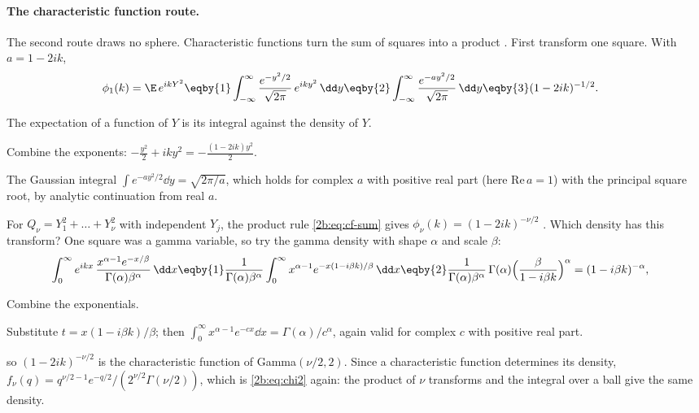 \paragraph{The characteristic function route.} The second route draws no sphere. Characteristic functions turn the sum of squares into a product . First transform one square. With $a=1-2ik$,
\begin{align}
  \phi_1(k)=\E\,e^{ikY^2}
  &\eqby{1} \int_{-\infty}^{\infty}\frac{e^{-y^2/2}}{\sqrt{2\pi}}\,e^{iky^2}\,\dd y
   \eqby{2} \int_{-\infty}^{\infty}\frac{e^{-ay^2/2}}{\sqrt{2\pi}}\,\dd y
   \eqby{3} (1-2ik)^{-1/2} .
  \label{2b:eq:chi2-cf1}
\end{align}
\begin{explain}
  \item The expectation of a function of $Y$ is its integral against the density of $Y$.
  \item Combine the exponents: $-\frac{y^2}{2}+iky^2=-\frac{(1-2ik)y^2}{2}$.
  \item The Gaussian integral $\int e^{-ay^2/2}\dd y=\sqrt{2\pi/a}$, which holds for complex $a$ with positive real part (here $\mathrm{Re}\,a=1$) with the principal square root, by analytic continuation from real $a$.
\end{explain}
For $Q_\nu=Y_1^2+\dots+Y_\nu^2$ with independent $Y_j$, the product rule \eqref{2b:eq:cf-sum} gives $\phi_\nu(k)=(1-2ik)^{-\nu/2}$ . Which density has this transform? One square was a gamma variable, so try the gamma density with shape $\alpha$ and scale $\beta$:
\begin{align}
  \int_0^\infty e^{ikx}\,\frac{x^{\alpha-1}e^{-x/\beta}}{\Gamma(\alpha)\beta^\alpha}\,\dd x
  &\eqby{1} \frac{1}{\Gamma(\alpha)\beta^\alpha}\int_0^\infty x^{\alpha-1}e^{-x(1-i\beta k)/\beta}\,\dd x
   \eqby{2} \frac{1}{\Gamma(\alpha)\beta^\alpha}\,\Gamma(\alpha)\Bigl(\frac{\beta}{1-i\beta k}\Bigr)^{\alpha}
   = (1-i\beta k)^{-\alpha} ,
  \label{2b:eq:gamma-cf}
\end{align}
\begin{explain}
  \item Combine the exponentials.
  \item Substitute $t=x(1-i\beta k)/\beta$; then $\int_0^\infty x^{\alpha-1}e^{-cx}\dd x=\Gamma(\alpha)/c^\alpha$, again valid for complex $c$ with positive real part.
\end{explain}
so $(1-2ik)^{-\nu/2}$ is the characteristic function of Gamma$(\nu/2,2)$. Since a characteristic function determines its density, $f_\nu(q)=q^{\nu/2-1}e^{-q/2}/(2^{\nu/2}\Gamma(\nu/2))$, which is \eqref{2b:eq:chi2} again: the product of $\nu$ transforms and the integral over a ball give the same density.

